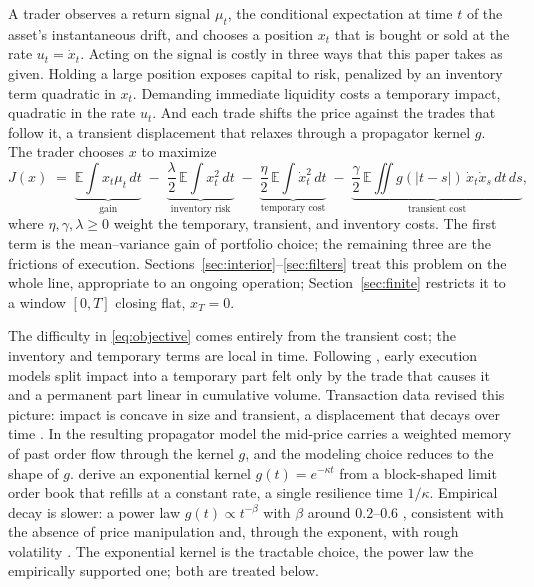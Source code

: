 \documentclass[11pt]{article}
\newcommand{\E}{\mathbb{E}}
\theoremstyle{plain}
\theoremstyle{definition}
\theoremstyle{remark}
\begin{document}
A trader observes a return signal $\mu_t$, the conditional expectation at time $t$ of the asset's instantaneous drift, and chooses a position $x_t$ that is bought or sold at the rate $u_t=\dot x_t$. Acting on the signal is costly in three ways that this paper takes as given. Holding a large position exposes capital to risk, penalized by an inventory term quadratic in $x_t$. Demanding immediate liquidity costs a temporary impact, quadratic in the rate $u_t$. And each trade shifts the price against the trades that follow it, a transient displacement that relaxes through a propagator kernel $g$. The trader chooses $x$ to maximize
\begin{equation}\label{eq:objective}
J(x) \;=\;
\underbrace{\E\!\int x_t\mu_t\,dt}_{\text{gain}}
\;-\; \underbrace{\frac{\lambda}{2}\,\E\!\int x_t^2\,dt}_{\text{inventory risk}}
\;-\; \underbrace{\frac{\eta}{2}\,\E\!\int \dot x_t^2\,dt}_{\text{temporary cost}}
\;-\; \underbrace{\frac{\gamma}{2}\,\E\!\iint g(|t-s|)\,\dot x_t \dot x_s\,dt\,ds}_{\text{transient cost}} ,
\end{equation}
where $\eta,\gamma,\lambda\ge0$ weight the temporary, transient, and inventory costs. The first term is the mean--variance gain of portfolio choice; the remaining three are the frictions of execution. Sections~\ref{sec:interior}--\ref{sec:filters} treat this problem on the whole line, appropriate to an ongoing operation; Section~\ref{sec:finite} restricts it to a window $[0,T]$ closing flat, $x_T=0$.

The difficulty in \eqref{eq:objective} comes entirely from the transient cost; the inventory and temporary terms are local in time. Following \citet{AlmgrenChriss2001}, early execution models split impact into a temporary part felt only by the trade that causes it and a permanent part linear in cumulative volume. Transaction data revised this picture: impact is concave in size \citep{LilloFarmerMantegna2003} and transient, a displacement that decays over time \citep{BouchaudGefenPottersWyart2004}. In the resulting propagator model the mid-price carries a weighted memory of past order flow through the kernel $g$, and the modeling choice reduces to the shape of $g$. \citet{ObizhaevaWang2013} derive an exponential kernel $g(t)=e^{-\kappa t}$ from a block-shaped limit order book that refills at a constant rate, a single resilience time $1/\kappa$. Empirical decay is slower: a power law $g(t)\propto t^{-\beta}$ with $\beta$ around $0.2$--$0.6$ \citep{BouchaudGefenPottersWyart2004,JusselinRosenbaum2020}, consistent with the absence of price manipulation \citep{Gatheral2010} and, through the exponent, with rough volatility \citep{JusselinRosenbaum2020}. The exponential kernel is the tractable choice, the power law the empirically supported one; both are treated below.
\end{document}
